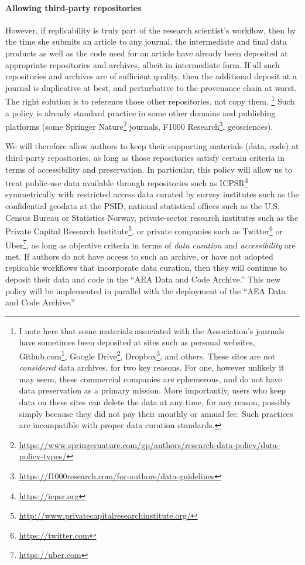 \documentclass[PP]{AEA}
\newcommand{\urlcite}[2]{#2\footnote{\url{#1}}}
\begin{document}
\paragraph{Allowing third-party repositories} However, if replicability is truly part of the research scientist's workflow, then by the time she submits an article to any journal, the intermediate and final data products as well as the code used for an article have already been deposited at appropriate repositories and archives, albeit in intermediate form. If all such repositories and archives are of sufficient quality, then the additional deposit at a journal is duplicative at best, and perturbative to the provenance chain at worst. The right solution is to reference those other repositories, not copy them.%
\footnote{I note here that some materials associated with the Association's journals have sometimes been deposited at sites such as personal websites, \urlcite{https://github.com}{Github.com}, \urlcite{https://drive.google.com}{Google Drive}, \urlcite{https://dropbox.com}{Dropbox}, and others. These sites are not \textit{considered} data archives, for two key reasons. For one, however unlikely it may seem, these commercial companies are ephemerous, and do not have data preservation as a primary mission. More importantly, users who keep data on these sites can delete the data at any time, for any reason, possibly simply because they did not pay their monthly or annual fee. Such practices are incompatible with proper data curation standards. }
Such a policy is already standard practice in some other domains and publishing platforms (some \urlcite{https://www.springernature.com/gp/authors/research-data-policy/data-policy-types/}{Springer Nature} journals, \urlcite{https://f1000research.com/for-authors/data-guidelines}{F1000 Research}, geosciences).

We will therefore allow authors to keep their supporting materials (data, code) at third-party repositories, as long as those repositories satisfy certain criteria in terms of accessibility and preservation. In particular, this policy will allow us to treat public-use data available through repositories such as \urlcite{https://icpsr.org}{ICPSR} symmetrically with restricted access data curated by survey institutes such as the confidential geodata at the \ac{PSID}, national statistical offices such as the U.S. Census Bureau or Statistics Norway, private-sector research institutes such as the \urlcite{http://www.privatecapitalresearchinstitute.org/}{Private Capital Research Institute}, or private companies such as \urlcite{https://twitter.com}{Twitter} or \urlcite{https://uber.com}{Uber}, as long as objective criteria in terms of \textit{data curation} and \textit{accessibility} are met. If authors do not have access to such an archive, or have not adopted replicable workflows that incorporate data curation, then they will continue to deposit their data and code in the ``AEA Data and Code Archive.'' This new policy will be implemented in parallel with the deployment of the ``AEA Data and Code Archive.''
\end{document}
